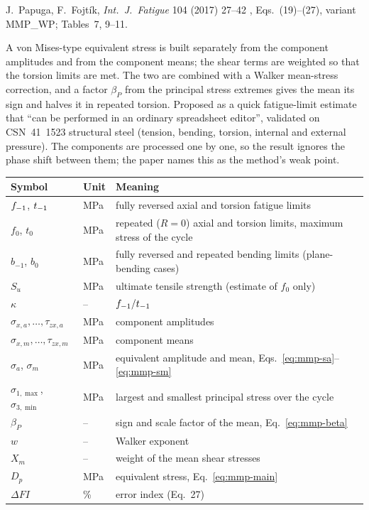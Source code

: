 \label{sheet:MMP}

 J.~Papuga, F.~Fojt\'ik, \emph{Int.\ J.\ Fatigue} 104 (2017) 27--42 \cite{papuga2017},
Eqs.~(19)--(27), variant MMP\_WP; Tables~7, 9--11.

 A von Mises-type equivalent stress is built separately from the component
amplitudes and from the component means; the shear terms are weighted so that the torsion limits are
met. The two are combined with a Walker mean-stress correction, and a factor $\beta_P$ from the
principal stress extremes gives the mean its sign and halves it in repeated torsion. Proposed as a
quick fatigue-limit estimate that ``can be performed in an ordinary spreadsheet editor'', validated on
CSN~41~1523 structural steel (tension, bending, torsion, internal and external pressure). The
components are processed one by one, so the result ignores the phase shift between them; the paper
names this as the method's weak point.

\begin{center}\small
\begin{tabular}{@{}llp{100mm}@{}}
\toprule
Symbol & Unit & Meaning\\\midrule
$f_{-1}$, $t_{-1}$ & MPa & fully reversed axial and torsion fatigue limits\\
$f_0$, $t_0$ & MPa & repeated ($R=0$) axial and torsion limits, maximum stress of the cycle\\
$b_{-1}$, $b_0$ & MPa & fully reversed and repeated bending limits (plane-bending cases)\\
$S_u$ & MPa & ultimate tensile strength (estimate of $f_0$ only)\\
$\kappa$ & -- & $f_{-1}/t_{-1}$\\
$\sigma_{x,a},\dots,\tau_{zx,a}$ & MPa & component amplitudes\\
$\sigma_{x,m},\dots,\tau_{zx,m}$ & MPa & component means\\
$\sigma_a$, $\sigma_m$ & MPa & equivalent amplitude and mean, Eqs.~\eqref{eq:mmp-sa}--\eqref{eq:mmp-sm}\\
$\sigma_{1,\max}$, $\sigma_{3,\min}$ & MPa & largest and smallest principal stress over the cycle\\
$\beta_P$ & -- & sign and scale factor of the mean, Eq.~\eqref{eq:mmp-beta}\\
$w$ & -- & Walker exponent\\
$X_m$ & -- & weight of the mean shear stresses\\
$D_p$ & MPa & equivalent stress, Eq.~\eqref{eq:mmp-main}\\
$\Delta FI$ & \% & error index (Eq.~27)\\
\bottomrule
\end{tabular}
\end{center}

